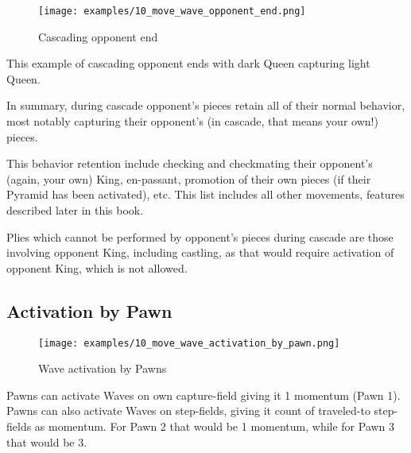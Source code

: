\clearpage %

\noindent
\begin{wrapfigure}[4]{l}{0.5625\textwidth}
\texttt{[image: examples/10\_move\_wave\_opponent\_end.png]}
\caption{Cascading opponent end}
\label{fig:10_move_wave_opponent_end}
\end{wrapfigure}
This example of cascading opponent ends with dark Queen capturing light Queen.

\vspace*{0.355\textheight}
In summary, during cascade opponent's pieces retain all of their normal behavior,
most notably capturing their opponent's (in cascade, that means your own!) pieces.

This behavior retention include checking and checkmating their opponent's (again,
your own) King, en-passant, promotion of their own pieces (if their Pyramid has
been activated), etc. This list includes all other movements, features described
later in this book.

Plies which cannot be performed by opponent's pieces during cascade are those
involving opponent King, including castling, as that would require activation of
opponent King, which is not allowed.

\clearpage %

\subsection*{Activation by Pawn}

\noindent
\begin{figure}[!h]
\texttt{[image: examples/10\_move\_wave\_activation\_by\_pawn.png]}
\caption{Wave activation by Pawns}
\label{fig:10_move_wave_activation_by_pawn}
\end{figure}

Pawns can activate Waves on own capture-field giving it 1 momentum (Pawn 1).
Pawns can also activate Waves on step-fields, giving it count of traveled-to
step-fields as momentum. For Pawn 2 that would be 1 momentum, while for Pawn 3
that would be 3.

\clearpage %

